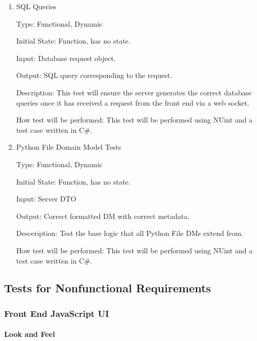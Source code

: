 \documentclass[12pt, titlepage]{article}
\begin{document}
    \begin{enumerate}

      \item{SQL Queries\\}

      Type: Functional, Dynamic

      Initial State: Function, has no state.

      Input: Database request object.

      Output: SQL query corresponding to the request.
                
      Description: This test will ensure the server generates the correct database
      queries once it has received a request from the front end via a web socket.

      How test will be performed: This test will be performed using NUint and a test
      case written in C\#.

      \item{Python File Domain Model Tests\\}

      Type: Functional, Dynamic

      Initial State: Function, has no state.

      Input: Server DTO

      Output: Correct formatted DM with correct metadata.

      Desceription: Test the base logic that all Python File DMs extend from.

      How test will be performed: This test will be performed using NUint and a test
      case written in C\#.

    \end{enumerate}

\subsection{Tests for Nonfunctional Requirements}

  \subsubsection{Front End JavaScript UI}
      
    \paragraph{Look and Feel}
\end{document}
